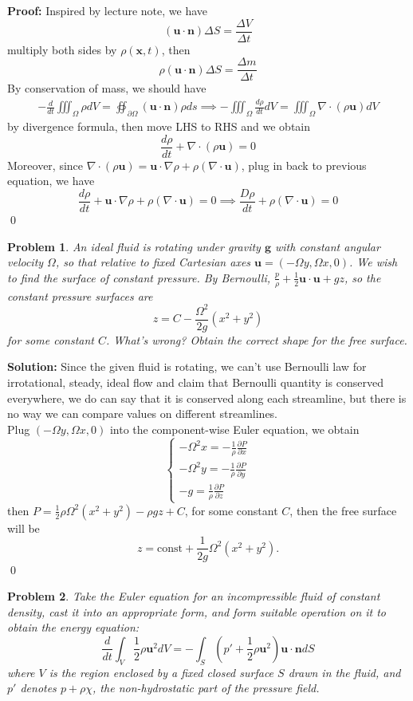 \documentclass[12pt]{article}
\newtheorem{problem}{Problem}
\begin{document}
\textbf{Proof:} Inspired by lecture note, we have 
$$
    (\textbf{u}\cdot\textbf{n})\Delta S = \frac{\Delta V}{\Delta t}
$$ multiply both sides by $\rho(\textbf{x}, t)$, then 
$$
    \rho(\textbf{u}\cdot\textbf{n})\Delta S=\frac{\Delta m}{\Delta t}
$$ By conservation of mass, we should have 
\begin{align*}
    -\frac{d}{dt}\iiint_{\Omega}\rho dV = \oiint_{\partial\Omega}(\textbf{u}\cdot\textbf{n})\rho ds \implies-\iiint_{\Omega}\frac{d\rho}{dt}dV=\iiint_{\Omega}\nabla\cdot(\rho\textbf{u})dV
\end{align*} by divergence formula, then move LHS to RHS and we obtain 
$$
    \frac{d\rho}{dt}+\nabla\cdot(\rho\textbf{u})=0
$$
\indent Moreover, since $\nabla\cdot (\rho\textbf{u})=\textbf{u}\cdot\nabla\rho+\rho(\nabla\cdot\textbf{u})$, plug in back to previous equation, we have 
$$
    \frac{d\rho}{dt}+\textbf{u}\cdot\nabla\rho+\rho(\nabla\cdot\textbf{u})=0 \implies \frac{D\rho}{dt}+\rho(\nabla\cdot\textbf{u})=0
$$ \qed
\\
\begin{problem}
    An ideal fluid is rotating under gravity $\textbf{g}$ with constant angular velocity $\Omega$, so that relative to fixed Cartesian axes $\textbf{u}=(-\Omega y,\Omega x, 0)$. We wish to find the surface of constant pressure. By Bernoulli, $\frac{p}{\rho}+\frac{1}{2}\textbf{u}\cdot\textbf{u}+gz$, so the constant pressure surfaces are 
    $$
        z= C-\frac{\Omega^2}{2g}(x^2+y^2)
    $$ for some constant $C$. What's wrong? Obtain the correct shape for the free surface.
\end{problem}

\textbf{Solution:} Since the given fluid is rotating, we can't use Bernoulli law for irrotational, steady, ideal flow and claim that Bernoulli quantity is conserved everywhere, we do can say that it is conserved along each streamline, but there is no way we can compare values on different streamlines. \\
\indent Plug $(-\Omega y, \Omega x, 0)$ into the component-wise Euler equation, we obtain 
$$
    \left\{\begin{matrix}
  -\Omega^2x=-\frac{1}{\rho}\frac{\partial P}{\partial x} \\
  -\Omega^2y=-\frac{1}{\rho}\frac{\partial P}{\partial y} \\
  -g = \frac{1}{\rho}\frac{\partial P}{\partial z}
\end{matrix}\right.
$$ then $P=\frac{1}{2}\rho\Omega^2(x^2+y^2)-\rho g z+C$, for some constant $C$, then the free surface will be 
$$
    z = \text{const} + \frac{1}{2g}\Omega^2(x^2+y^2).
$$ \qed
\\
\begin{problem}
    Take the Euler equation for an incompressible fluid of constant density, cast it into an appropriate form, and form suitable operation on it to obtain the energy equation:
    $$
        \frac{d}{dt}\int_{V}\frac{1}{2}\rho\textbf{u}^2dV=-\int_S\left(p'+\frac{1}{2}\rho\textbf{u}^2\right)\textbf{u}\cdot\textbf{n}dS
    $$ where $V$ is the region enclosed by a fixed closed surface $S$ drawn in the fluid, and $p'$ denotes $p+\rho\chi$, the non-hydrostatic part of the pressure field.
\end{problem}
\end{document}
